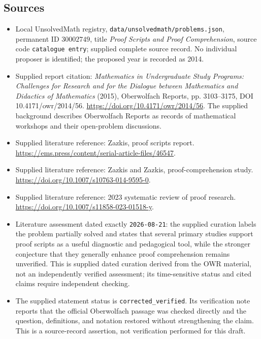 \documentclass[11pt]{article}
\begin{document}
\subsection{Sources}
\begin{itemize}
\item Local UnsolvedMath registry, \texttt{data/unsolvedmath/problems.json}, permanent ID \(30002749\), title \emph{Proof Scripts and Proof Comprehension}, source code \texttt{catalogue entry}; supplied complete source record. No individual proposer is identified; the proposed year is recorded as 2014.
\item Supplied report citation: \emph{Mathematics in Undergraduate Study Programs: Challenges for Research and for the Dialogue between Mathematics and Didactics of Mathematics} (2015), Oberwolfach Reports, pp. 3103--3175, DOI 10.4171/owr/2014/56. \url{https://doi.org/10.4171/owr/2014/56}. The supplied background describes Oberwolfach Reports as records of mathematical workshops and their open-problem discussions.
\item Supplied literature reference: Zazkis, proof scripts report. \url{https://ems.press/content/serial-article-files/46547}.
\item Supplied literature reference: Zazkis and Zazkis, proof-comprehension study. \url{https://doi.org/10.1007/s10763-014-9595-0}.
\item Supplied literature reference: 2023 systematic review of proof research. \url{https://doi.org/10.1007/s11858-023-01518-y}.
\item Literature assessment dated exactly \texttt{2026-08-21}: the supplied curation labels the problem partially solved and states that several primary studies support proof scripts as a useful diagnostic and pedagogical tool, while the stronger conjecture that they generally enhance proof comprehension remains unverified. This is supplied dated curation derived from the OWR material, not an independently verified assessment; its time-sensitive status and cited claims require independent checking.
\item The supplied statement status is \texttt{corrected\_verified}. Its verification note reports that the official Oberwolfach passage was checked directly and the question, definitions, and notation restored without strengthening the claim. This is a source-record assertion, not verification performed for this draft.
\end{itemize}
\end{document}
